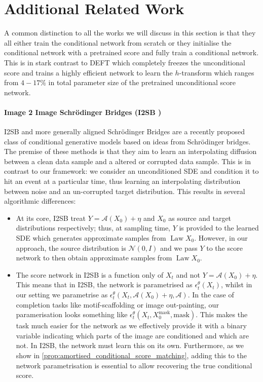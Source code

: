 \section{Additional Related Work}
\label{sec:related_work}

A common distinction to all the works we will discuss in this section is that they all either train the conditional network from scratch or they initialise the conditional network with a pretrained score and fully train a conditional network. This is in stark contrast to DEFT which completely freezes the unconditional score and trains a highly efficient network to learn the $h$-transform which ranges from $4-17\%$ in total parameter size of the pretrained unconditional score network.

\paragraph{Image 2 Image Schr\"{o}dinger Bridges (I2SB \parencite{liu20232})}{ I2SB  and more generally aligned Schr\"{o}dinger Bridges \citep{somnath2023aligned} are a recently proposed class of conditional generative models based on ideas from Schr\"{o}dinger bridges. The premise of these methods is that they aim to learn an interpolating diffusion between a clean data sample and a altered or corrupted data sample. This is in contrast to our framework: we consider an unconditioned SDE and condition it to hit an event at a particular time, thus learning an interpolating distribution between noise and an un-corrupted target distribution. This results in several algorithmic differences:

\begin{itemize}
    \item At its core, I2SB treat $Y = \mathcal{A}(X_0) +\eta$ and $X_0$ as source and target distributions respectively; thus, at sampling time, $Y$ is provided to the learned SDE which generates approximate samples from $\operatorname{Law} {X_0}$. However, in our approach, the source distribution is $\mathcal{N}(0,{I})$ and we pass $Y$ to the score network to then obtain approximate samples from $\operatorname{Law} {X_0}$.
    
    \item The score network in I2SB is a function only of $X_t$ and not $Y=\mathcal{A}(X_0) +\eta$. This means that in I2SB, the network is parametrised as $\epsilon^{\theta}_t(X_t)$, whilst in our setting we parametrise as $\epsilon^{\theta}_t(X_t, \mathcal{A}(X_0) +\eta, \mathcal{A})$. In the case of completion tasks like motif-scaffolding or image out-painting, our paramerisation looks something like $\epsilon^{\theta}_t(X_t, X_0^{\mathrm{mask}}, \mathrm{mask})$. This makes the task much easier for the network as we effectively provide it with a binary variable indicating which parts of the image are conditioned and which are not. In I2SB,  the network must learn this on its own. Furthermore, as we show in \cref{prop:amortised_conditional_score_matching}, adding this to the network parametrisation is essential to allow recovering the true conditional score.
    

\end{itemize}}
